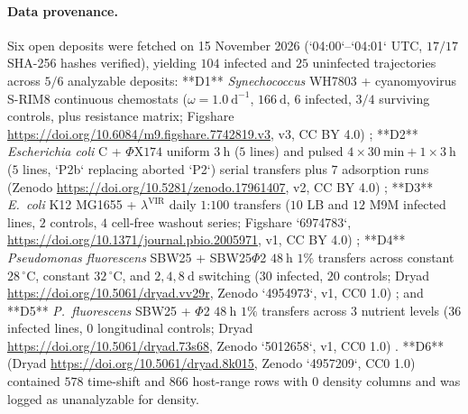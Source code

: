 \paragraph{Data provenance.}
Six open deposits were fetched on 15 November 2026 (`04:00`--`04:01` UTC, $17/17$ SHA-256 hashes verified), yielding $104$ infected and $25$ uninfected trajectories across $5/6$ analyzable deposits: **D1** \textit{Synechococcus} WH7803 + cyanomyovirus S-RIM8 continuous chemostats ($\omega = 1.0\ \mathrm{d}^{-1}$, $166\ \mathrm{d}$, $6$ infected, $3/4$ surviving controls, plus resistance matrix; Figshare \url{https://doi.org/10.6084/m9.figshare.7742819.v3}, v3, CC BY 4.0) \citep{larsen2019}; **D2** \textit{Escherichia coli} C + $\Phi\mathrm{X}174$ uniform $3\ \mathrm{h}$ ($5$ lines) and pulsed $4 \times 30\ \mathrm{min} + 1 \times 3\ \mathrm{h}$ ($5$ lines, `P2b` replacing aborted `P2`) serial transfers plus $7$ adsorption runs (Zenodo \url{https://doi.org/10.5281/zenodo.17961407}, v2, CC BY 4.0) \citep{reuter2026}; **D3** \textit{E.~coli} K12 MG1655 + $\lambda^{\mathrm{VIR}}$ daily $1\text{:}100$ transfers ($10$ LB and $12$ M9M infected lines, $2$ controls, $4$ cell-free washout series; Figshare `6974783`, \url{https://doi.org/10.1371/journal.pbio.2005971}, v1, CC BY 4.0) \citep{chaudhry2018}; **D4** \textit{Pseudomonas fluorescens} SBW25 + SBW25$\Phi$2 $48\ \mathrm{h}$ $1\%$ transfers across constant $28\,^{\circ}\mathrm{C}$, constant $32\,^{\circ}\mathrm{C}$, and $2, 4, 8\ \mathrm{d}$ switching ($30$ infected, $20$ controls; Dryad \url{https://doi.org/10.5061/dryad.vv29r}, Zenodo `4954973`, v1, CC0 1.0) \citep{duncan2017}; and **D5** \textit{P.~fluorescens} SBW25 + $\Phi$2 $48\ \mathrm{h}$ $1\%$ transfers across $3$ nutrient levels ($36$ infected lines, $0$ longitudinal controls; Dryad \url{https://doi.org/10.5061/dryad.73s68}, Zenodo `5012658`, v1, CC0 1.0) \citep{zhao2017}. **D6** (Dryad \url{https://doi.org/10.5061/dryad.8k015}, Zenodo `4957209`, CC0 1.0) \citep{harrison2013} contained $578$ time-shift and $866$ host-range rows with $0$ density columns and was logged as unanalyzable for density.

